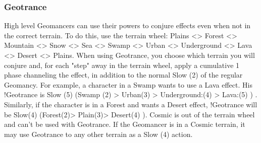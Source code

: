 \subsubsection{Geotrance}

\begin{multicols}{2}

	High level Geomancers can use their powers to conjure effects even when not in the correct terrain. To do this, use the terrain wheel: Plains <> Forest <> Mountain <> Snow <> Sea <> Swamp <> Urban <> Underground <> Lava <> Desert <> Plains. When using Geotrance, you choose which terrain you will conjure and, for each "step" away in the terrain wheel, apply a cumulative 1 phase channeling the effect, in addition to the normal Slow (2) of the regular Geomancy. For example, a character in a Swamp wants to use a Lava effect. His !Geotrance is Slow (5) (Swamp (2) > Urban(3) > Underground:(4) > Lava:(5) ) . Similarly, if the character is in a Forest and wants a Desert effect, !Geotrance will be Slow(4) (Forest(2)> Plain(3)> Desert(4) ). Cosmic is out of the terrain wheel and can’t be used with Geotrance. If the Geomancer is in a Cosmic terrain, it may use Geotrance to any other terrain as a Slow (4) action.

\end{multicols}